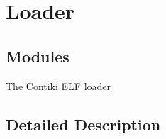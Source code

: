 \hypertarget{group__loader}{}\section{Loader}
\label{group__loader}
\subsection*{Modules}
\begin{DoxyCompactItemize}
\item 
\hyperlink{group__elfloader}{The Contiki E\+L\+F loader}
\end{DoxyCompactItemize}


\subsection{Detailed Description}

